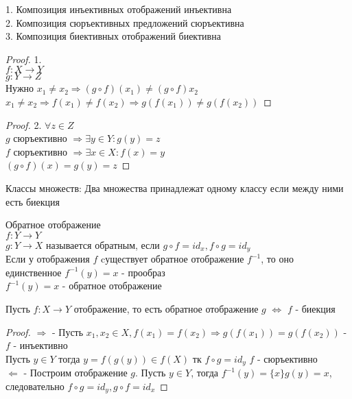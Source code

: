 \begin{properties}
1. Композиция инъективных отображений инъективна\\
2. Композиция сюръективных предложений сюръективна\\
3. Композиция биективных отображений биективна
\begin{proof}
1.\\
$ f: X \rightarrow Y $\\
$ g: Y \rightarrow Z $\\
Нужно $x_1 \neq x_2 \Rightarrow (g \circ f)(x_1) \neq (g\circ f) x_2 $\\
$ x_1 \neq x_2 \Rightarrow f(x_1) \neq f(x_2) \Rightarrow g(f(x_1)) \neq g(f(x_2))  $
\end{proof}
\begin{proof}
2. $ \forall z \in Z $\\
$g$ сюръективно $ \Rightarrow \exists y \in Y : g(y) = z $\\
$f$ сюръективно $ \Rightarrow \exists x \in X : f(x) = y $\\
$ (g \circ f)(x) = g(y) = z $ 
\end{proof}
\end{properties}
\begin{definition}
Классы множеств:
Два множества принадлежат одному классу если между ними есть биекция
\end{definition}
\begin{definition}
Обратное отображение \\ $ f : Y \rightarrow Y $ \\ 
$ g: Y \rightarrow X $ называется обратным, если $ g \circ f = id_x, f \circ g = id_y $ \\
Если у отображения $ f $ cуществует обратное отображение $ f^{-1} $, то оно единственное
$ f^{-1} (y) = {x} $ - прообраз \\
$ f^{-1} (y) = x $ - обратное отображение
\end{definition}

\begin{theorem}
Пусть $ f : X \rightarrow Y $ отображение, то есть обратное отображение $g$ $ \Leftrightarrow $ $f$ - биекция 
\begin{proof}
$\Rightarrow$ - Пусть $x_1, x_2 \in X, f(x_1) = f(x_2) \Rightarrow g(f(x_1)) = g(f(x_2))$ - $f$ - инъективно\\
Пусть $ y \in Y $ тогда $ y = f(g(y)) \in f(X) $ тк $f \circ g = id_y $
$f$ - сюръективно\\
$\Leftarrow$ - Построим отображение $g$. Пусть $y \in Y$, тогда $f^{-1}(y) = \{x\}  g(y) = x$, следовательно $f \circ g = id_y, g \circ f = id_x$
\end{proof}
\end{theorem}


